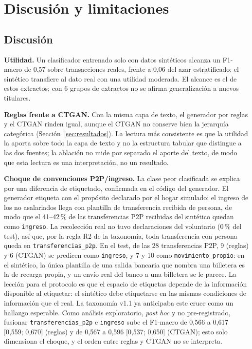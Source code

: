 \documentclass[journal]{IEEEtai}
\begin{document}
\section{Discusión y limitaciones}
\label{sec:discusion}
\subsection{Discusión}
\textbf{Utilidad.} Un clasificador entrenado solo con datos sintéticos alcanza un F1-macro de 0{,}57 sobre transacciones reales, frente a 0{,}06 del azar estratificado: el sintético transfiere al dato real con una utilidad moderada. El alcance es el de estos extractos; con 6 grupos de extractos no se afirma generalización a nuevos titulares.

\textbf{Reglas frente a CTGAN.} Con la misma capa de texto, el generador por reglas y el CTGAN rinden igual, aunque el CTGAN no conserve bien la jerarquía categórica (Sección~\ref{sec:resultados}). La lectura más consistente es que la utilidad la aporta sobre todo la capa de texto y no la estructura tabular que distingue a las dos fuentes; la ablación no mide por separado el aporte del texto, de modo que esta lectura es una interpretación, no un resultado.

\textbf{Choque de convenciones P2P/ingreso.} La clase peor clasificada se explica por una diferencia de etiquetado, confirmada en el código del generador. El generador etiqueta con el propósito declarado por el hogar simulado: el ingreso de los no asalariados llega con plantilla de transferencia recibida de persona, de modo que el 41--42\,\% de las transferencias P2P recibidas del sintético quedan como \texttt{ingreso}. La recolección real no tuvo declaraciones del voluntario (0\,\% del test), así que, por la regla R2 de la taxonomía, toda transferencia con persona queda en \texttt{transferencias\_p2p}. En el test, de las 28 transferencias P2P, 9 (reglas) y 6 (CTGAN) se predicen como \texttt{ingreso}, y 7 y 10 como \texttt{movimiento\_propio}: en el sintético, la única plantilla de una salida bancaria que nombra una billetera es la de recarga propia, y un envío real del banco a una billetera se le parece. La lección para el protocolo es que el espacio de etiquetas depende de la información disponible al etiquetar: el sintético debe etiquetarse en las mismas condiciones de información que el real. La taxonomía v1.1 ya anticipaba este cruce como un hallazgo esperable. Como análisis exploratorio, \emph{post hoc} y no pre-registrado, fusionar \texttt{transferencias\_p2p} e \texttt{ingreso} sube el F1-macro de 0{,}566 a 0{,}617 [0{,}559; 0{,}670] (reglas) y de 0{,}567 a 0{,}596 [0{,}537; 0{,}650] (CTGAN); esto solo dimensiona el choque, y el orden entre reglas y CTGAN no se interpreta.
\end{document}
